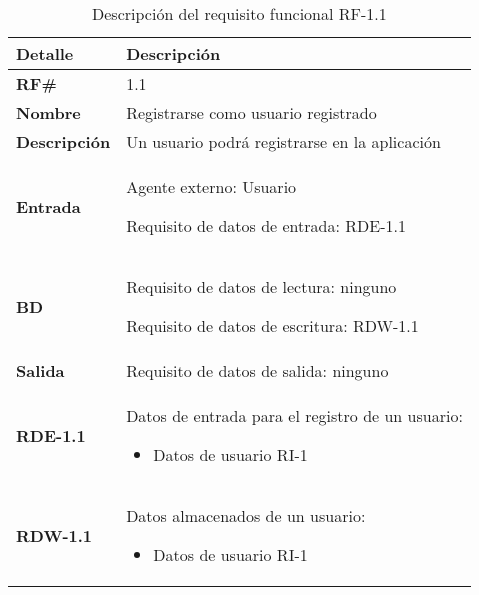 \begin{table}[H]
    \centering
    \begin{tabular}{|p{4cm}|p{7cm}|}
        \hline
        \rowcolor{lightgray}
        \textbf{Detalle} & \textbf{Descripción} \\
        \hline
        \textbf{RF\#} & 1.1 \\
        \hline
        \textbf{Nombre} & Registrarse como usuario registrado \\
        \hline
        \textbf{Descripción} & Un usuario podrá registrarse en la aplicación \\
        \hline
        \textbf{Entrada} &
        Agente externo: Usuario
        
        Requisito de datos de entrada: RDE-1.1 \\
        \hline
        \textbf{BD} &
        Requisito de datos de lectura: ninguno
        
        Requisito de datos de escritura: RDW-1.1 \\
        \hline
        \textbf{Salida} & Requisito de datos de salida: ninguno \\
        \hline
        \textbf{RDE-1.1} & Datos de entrada para el registro de un usuario:
            \begin{itemize}
                \item Datos de usuario RI-1
            \end{itemize} \\
        \hline
        \textbf{RDW-1.1} & Datos almacenados de un usuario:
            \begin{itemize}
                \item Datos de usuario RI-1
            \end{itemize} \\
        \hline
    \end{tabular}
    \caption{Descripción del requisito funcional RF-1.1}
    \label{tab:rf-1-1}
\end{table}

